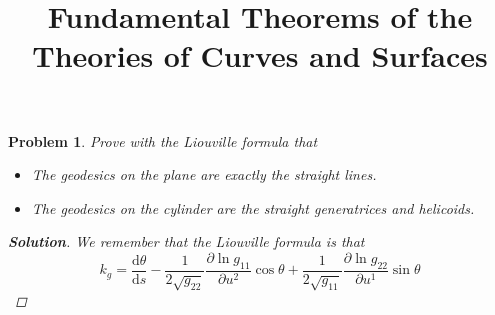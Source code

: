 \documentclass[11pt]{article}
\title{Fundamental Theorems of the Theories of Curves and Surfaces}
\newcommand{\dd}{\mathrm{d}}
\newcommand{\pd}{\partial}
\newtheorem{problem}{Problem}
\numberwithin{problem}{section}
\newenvironment{solution}
               {\let\oldqedsymbol=\qedsymbol
                \renewcommand{\qedsymbol}{$\blacktriangleleft$}
                \begin{proof}[\bfseries\upshape Solution]}
               {\end{proof}
                \renewcommand{\qedsymbol}{\oldqedsymbol}}
\begin{document}
\maketitle

\section{}

\begin{problem}

Prove with the Liouville formula that 
\begin{itemize}
\item[(1)] The geodesics on the plane are exactly the straight lines.

\item[(2)] The geodesics on the cylinder are the straight generatrices and helicoids.
\end{itemize}

\begin{solution}

We remember that the Liouville formula is that 
$$ k_g = \dfrac{\dd \theta}{\dd s} - \dfrac{1}{2\sqrt{g_{22}}} \dfrac{\pd \ln g_{11} }{\pd u^2} \cos \theta + \dfrac{1}{2\sqrt{g_{11}}} \dfrac{\pd \ln g_{22} }{\pd u^1} \sin \theta$$

\end{solution}
\end{problem}
\end{document}
